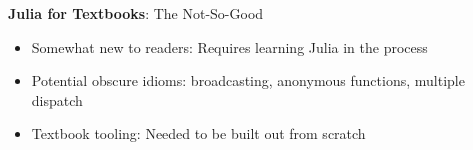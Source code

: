 \begin{frame}[fragile]{\textbf{Julia for Textbooks}: \textcolor{cardinal}{The Not-So-Good}}
    
\pause

\begin{itemize}
  \item \textcolor{cardinal}{Somewhat new to readers:} Requires learning Julia in the process \pause
  \item \textcolor{cardinal}{Potential obscure idioms:} broadcasting, anonymous functions, multiple dispatch \pause
  \item \textcolor{cardinal}{Textbook tooling:} Needed to be built out from scratch
\end{itemize}

\end{frame}